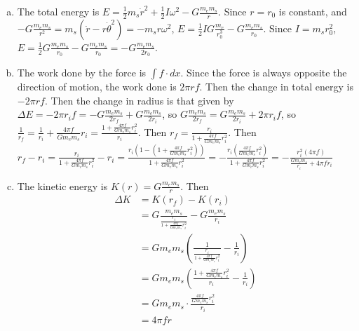 \documentclass{esg8012pset}
\begin{document}
\begin{solution}
\begin{enumerate}[(a)]
  \item The total energy is $E = \frac12 m_s \dot r^2 + \frac12 I\omega^2 - G\frac{m_e m_s}{r}$.  Since $r = r_0$ is constant, and $-G \frac{m_e m_s}{r^2} = m_s (\ddot r - r\dot\theta^2) = - m_s r \omega^2$, $E = \frac12 I G \frac{m_e}{r_0^3} - G\frac{m_e m_s}{r_0}$.   Since $I = m_s r_0^2$, $E = \frac12 G \frac{m_e m_s}{r_0} - G\frac{m_e m_s}{r_0} = -G\frac{m_e m_s}{2r_0}$.
  \item The work done by the force is $\int f \cdot d x$.  Since the force is always opposite the direction of motion, the work done is $2\pi r f$.  Then the change in total energy is $-2\pi r f$.  Then the change in radius is that given by $\Delta E = -2\pi r_i f = -G\frac{m_e m_s}{2r_f} + G\frac{m_e m_s}{2r_i}$, so $G\frac{m_e m_s}{2r_f} = G\frac{m_e m_s}{2r_i} + 2\pi r_i f$, so $\frac{1}{r_f} = \frac{1}{r_i} + \frac{4\pi f}{G m_e m_s} r_i = \frac{1 + \frac{4\pi f}{G m_e m_s} r_i^2}{r_i}$.  Then $r_f = \frac{r_i}{1 + \frac{4\pi f}{G m_e m_s} r_i^2}$.  Then $r_f - r_i = \frac{r_i}{1 + \frac{4\pi f}{G m_e m_s} r_i^2} - r_i = \frac{r_i\left(1-\left(1 + \frac{4\pi f}{G m_e m_s} r_i^2\right)\right)}{1 + \frac{4\pi f}{G m_e m_s} r_i^2} = -\frac{r_i\left(\frac{4\pi f}{G m_e m_s} r_i^2\right)}{1 + \frac{4\pi f}{G m_e m_s} r_i^2} = -\frac{r_i^2(4\pi f)}{\frac{G m_e m_s}{r_i} + 4\pi f r_i}$
  \item The kinetic energy is $K(r) = G \frac{m_e m_s}{r}$.  Then \begin{align*}
 \Delta K & = K(r_f) - K(r_i) \\
  & = G \frac{m_e m_s}{\frac{r_i}{1 + \frac{4\pi f}{G m_e m_s} r_i^2}} - G \frac{m_e m_s}{r_i} \\
  & = G m_e m_s \left( \frac{1}{\frac{r_i}{1 + \frac{4\pi f}{G m_e m_s} r_i^2}} - \frac{1}{r_i}\right) \\
  & = G m_e m_s \left( \frac{1 + \frac{4\pi f}{G m_e m_s} r_i^2}{r_i} - \frac{1}{r_i}\right) \\
  & = G m_e m_s\cdot \frac{\frac{4\pi f}{G m_e m_s} r_i^2}{r_i} \\
  & = 4\pi f r
\end{align*}
\end{enumerate}
\end{solution}
\end{document}
